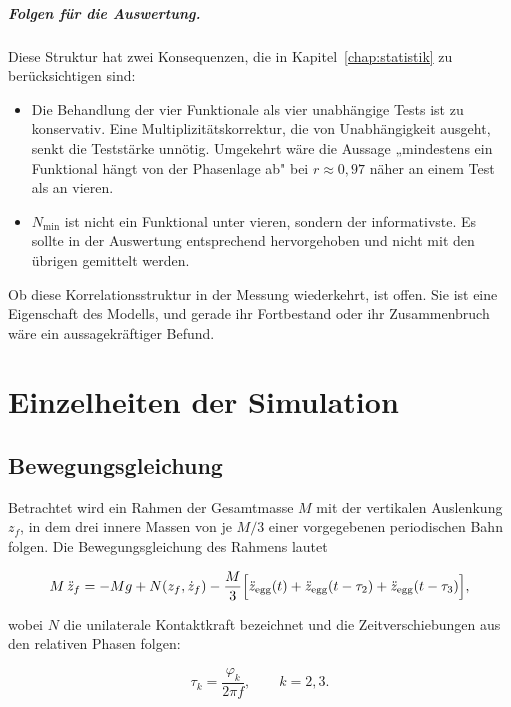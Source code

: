 \documentclass[12pt,a4paper]{report}
\begin{document}
\paragraph{Folgen für die Auswertung.}
Diese Struktur hat zwei Konsequenzen, die in
Kapitel~\ref{chap:statistik} zu berücksichtigen sind:

\begin{itemize}
\item Die Behandlung der vier Funktionale als vier unabhängige Tests ist
      zu konservativ. Eine Multiplizitätskorrektur, die von
      Unabhängigkeit ausgeht, senkt die Teststärke unnötig. Umgekehrt
      wäre die Aussage „mindestens ein Funktional hängt von der
      Phasenlage ab" bei $r \approx 0{,}97$ näher an einem Test als an
      vieren.
\item $N_{\min}$ ist nicht ein Funktional unter vieren, sondern der
      informativste. Es sollte in der Auswertung entsprechend
      hervorgehoben und nicht mit den übrigen gemittelt werden.
\end{itemize}

Ob diese Korrelationsstruktur in der Messung wiederkehrt, ist offen. Sie
ist eine Eigenschaft des Modells, und gerade ihr Fortbestand oder ihr
Zusammenbruch wäre ein aussagekräftiger Befund.


\chapter{Einzelheiten der Simulation}
\label{app:simulation}

\section{Bewegungsgleichung}

Betrachtet wird ein Rahmen der Gesamtmasse $M$ mit der vertikalen
Auslenkung $z_f$, in dem drei innere Massen von je $M/3$ einer
vorgegebenen periodischen Bahn folgen. Die Bewegungsgleichung des
Rahmens lautet

\begin{equation}
M\,\ddot{z}_f = -M g + N(z_f, \dot{z}_f)
- \frac{M}{3}\Bigl[\ddot{z}_{\mathrm{egg}}(t)
+ \ddot{z}_{\mathrm{egg}}(t-\tau_2)
+ \ddot{z}_{\mathrm{egg}}(t-\tau_3)\Bigr],
\label{eq:bewegung}
\end{equation}

wobei $N$ die unilaterale Kontaktkraft bezeichnet und die
Zeitverschiebungen aus den relativen Phasen folgen:

\begin{equation}
\tau_k = \frac{\varphi_k}{2\pi f}, \qquad k = 2,3.
\label{eq:tau}
\end{equation}
\end{document}
